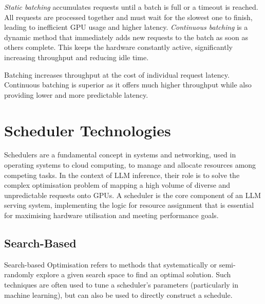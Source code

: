 \textit{Static batching} accumulates requests until a batch is full or a timeout is reached.
All requests are processed together and must wait for the slowest one to finish, leading to inefficient GPU usage and higher latency. %
\textit{Continuous batching} is a dynamic method that immediately adds new requests to the batch as soon as others complete.
This keeps the hardware constantly active, significantly increasing throughput and reducing idle time. %

Batching increases throughput at the cost of individual request latency.
Continuous batching is superior as it offers much higher throughput while also providing lower and more predictable latency. %

\section{Scheduler Technologies}

Schedulers are a fundamental concept in systems and networking, used in operating systems to cloud computing, to manage and allocate resources among competing tasks.
In the context of LLM inference, their role is to solve the complex optimisation problem of mapping a high volume of diverse and unpredictable requests onto GPUs. %
A scheduler is the core component of an LLM serving system, implementing the logic for resource assignment that is essential for maximising hardware utilisation and meeting performance goals.

%
%
%
%
%
%

%
%
%
%
%

\subsection{Search-Based}
Search-based Optimisation refers to methods that systematically or semi-randomly explore a given search space to find an optimal solution.
Such techniques are often used to tune a scheduler's parameters (particularly in machine learning), but can also be used to directly construct a schedule.

